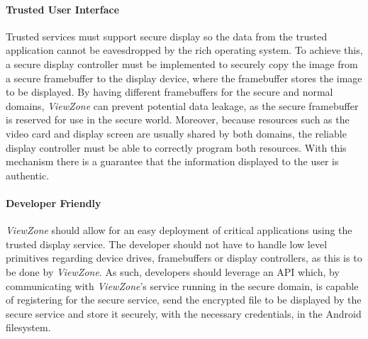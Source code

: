 \paragraph{\textbf{Trusted User Interface}}

Trusted services must support secure display so the data from the trusted application cannot be eavesdropped by the rich operating system. To achieve this, a secure display controller must be implemented to securely copy the image from a secure framebuffer to the display device, where the framebuffer stores the image to be displayed. By having different framebuffers for the secure and normal domains, \emph{ViewZone} can prevent potential data leakage, as the secure framebuffer is reserved for use in the secure world. Moreover, because resources such as the video card and display screen are usually shared by both domains, the reliable display controller must be able to correctly program both resources. With this mechanism there is a guarantee that the information displayed to the user is authentic.

\paragraph{\textbf{Developer Friendly}}

\emph{ViewZone} should allow for an easy deployment of critical applications using the trusted display service. The developer should not have to handle low level primitives regarding device drives, framebuffers or display controllers, as this is to be done by \emph{ViewZone}. As such, developers should leverage an API which, by communicating with \emph{ViewZone}'s service running in the secure domain, is capable of registering for the secure service, send the encrypted file to be displayed by the secure service and store it securely, with the necessary credentials, in the Android filesystem.



